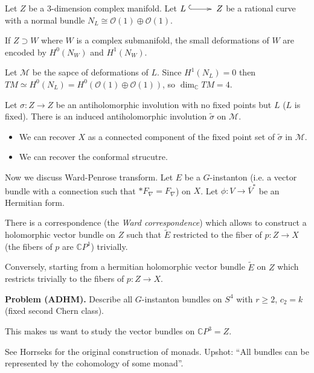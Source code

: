Let $Z$ be a 3-dimension complex manifold.
Let $L \xymatrix{\ar@{^{(}->}[r]&} Z$
be a rational curve with a normal bundle
$N_L \cong \mathcal{O}(1) \oplus \mathcal{O}(1)$.

\begin{remark}
\label{remark-small-deformations}
If $Z \supset W$ where $W$ is a complex submanifold,
the small deformations of $W$ are encoded by
$H^0(N_W)$ and $H^1(N_W)$.
\end{remark}

Let $\mathcal{M}$ be the sapce of deformations of $L$.
Since $H^1(N_L)=0$ then 
$TM \simeq H^0(N_L) = H^0(\mathcal{O}(1) \oplus \mathcal{O}(1))$,
so $\dim_\mathbb{C}TM=4$.

Let $\sigma:Z \to Z$ be an antiholomorphic involution
with no fixed points but $L$ ($L$ is fixed).
There is an induced antiholomorphic involution 
$\tilde{\sigma}$ on $\mathcal{M}$.

\begin{remark}
\label{remark-antiholomorphic-involution}
\begin{itemize}
\item We can recover $X$ as a connected component
of the fixed point set of $\tilde{\sigma}$ in $\mathcal{M}$.
\item We can recover the conformal strucutre.
 
\end{itemize}\end{remark}

\medskip\noindent
Now we discuss Ward-Penrose transform.
Let $E$ be a $G$-instanton
(i.e. a vector bundle with a connection such that
$*F_\nabla=F_\nabla$) on $X$.
Let $\phi:V \to \overline{V}^*$ be an Hermitian form.

There is a correspondence (the {\it Ward correspondence})
which allows to construct a holomorphic vector bundle on $Z$
such that $\tilde{E}$ restricted to the fiber of $p:Z \to X$
(the fibers of $p$ are $\mathbb{C}P^1$) trivially.

Conversely, starting from a hermitian holomorphic vector bundle $\tilde{E}$
on $Z$ which restricts trivially to the fibers of $p:Z \to X$.

\medskip\noindent
{\bf Problem (ADHM).} Describe all $G$-instanton bundles on $S^4$
with $r \geq 2$, $c_2=k$ (fixed second Chern class).

This makes us want to study the vector bundles on $\mathbb{C}P^3=Z$.

See Horrseks for the original construction of monads.
Upshot: ``All bundles can be represented by the cohomology of some monad''.

